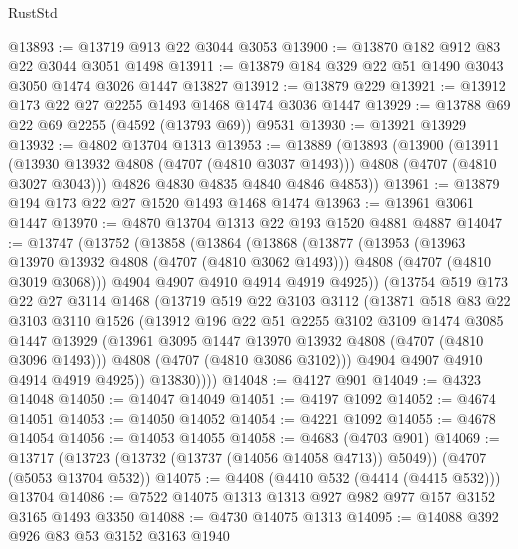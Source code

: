 \begin{lexlean}{RustStd}
\begin{coremodule}
@13893 := @13719 @913 @22 @3044 @3053
@13900 := @13870 @182 @912 @83 @22 @3044 @3051 @1498
@13911 := @13879 @184 @329 @22 @51 @1490 @3043 @3050 @1474 @3026 @1447 @13827
@13912 := @13879 @229
@13921 := @13912 @173 @22 @27 @2255 @1493 @1468 @1474 @3036 @1447
@13929 := @13788 @69 @22 @69 @2255 (@4592 (@13793 @69)) @9531
@13930 := @13921 @13929
@13932 := @4802 @13704 @1313
@13953 := @13889
    (@13893
      (@13900
        (@13911 (@13930 @13932 @4808 (@4707 (@4810 @3037 @1493))) @4808 (@4707 (@4810 @3027 @3043)))
        @4826
        @4830
        @4835
        @4840
        @4846
        @4853))
@13961 := @13879 @194 @173 @22 @27 @1520 @1493 @1468 @1474
@13963 := @13961 @3061 @1447
@13970 := @4870 @13704 @1313 @22 @193 @1520 @4881 @4887
@14047 := @13747
    (@13752
      (@13858
        (@13864
          (@13868
            (@13877
              (@13953
                (@13963 @13970 @13932 @4808 (@4707 (@4810 @3062 @1493)))
                @4808
                (@4707 (@4810 @3019 @3068)))
              @4904
              @4907
              @4910
              @4914
              @4919
              @4925))
          (@13754
            @519
            @173
            @22
            @27
            @3114
            @1468
            (@13719
              @519
              @22
              @3103
              @3112
              (@13871
                @518
                @83
                @22
                @3103
                @3110
                @1526
                (@13912
                  @196
                  @22
                  @51
                  @2255
                  @3102
                  @3109
                  @1474
                  @3085
                  @1447
                  @13929
                  (@13961 @3095 @1447 @13970 @13932 @4808 (@4707 (@4810 @3096 @1493)))
                  @4808
                  (@4707 (@4810 @3086 @3102)))
                @4904
                @4907
                @4910
                @4914
                @4919
                @4925))
            @13830))))
@14048 := @4127 @901
@14049 := @4323 @14048
@14050 := @14047 @14049
@14051 := @4197 @1092
@14052 := @4674 @14051
@14053 := @14050 @14052
@14054 := @4221 @1092
@14055 := @4678 @14054
@14056 := @14053 @14055
@14058 := @4683 (@4703 @901)
@14069 := @13717 (@13723 (@13732 (@13737 (@14056 @14058 @4713)) @5049)) (@4707 (@5053 @13704 @532))
@14075 := @4408 (@4410 @532 (@4414 (@4415 @532))) @13704
@14086 := @7522 @14075 @1313 @1313 @927 @982 @977 @157 @3152 @3165 @1493 @3350
@14088 := @4730 @14075 @1313
@14095 := @14088 @392 @926 @83 @53 @3152 @3163 @1940

\end{coremodule}
\end{lexlean}
